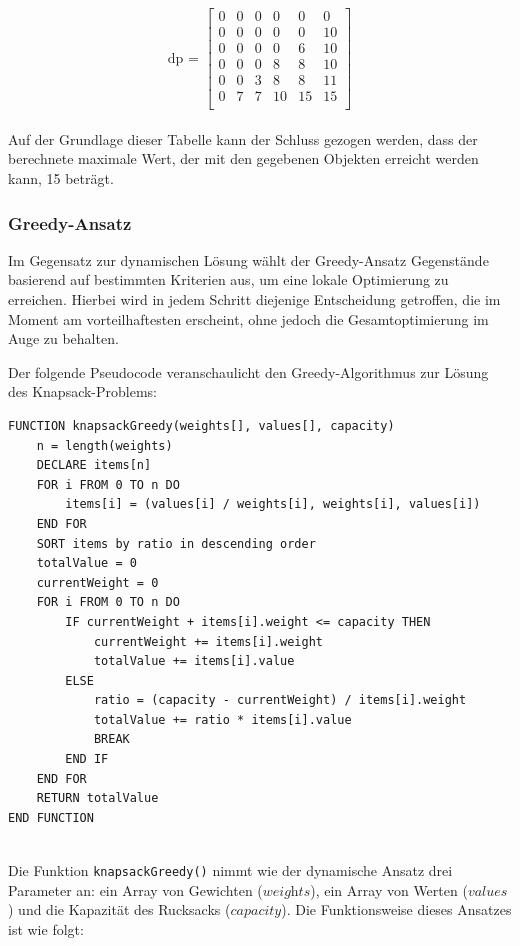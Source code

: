 \[
\text{dp = }
\left[
\begin{array}{cccccc}
0 & 0 & 0 & 0 & 0 & 0 \\
0 & 0 & 0 & 0 & 0 & 10 \\
0 & 0 & 0 & 0 & 6 & 10 \\
0 & 0 & 0 & 8 & 8 & 10 \\
0 & 0 & 3 & 8 & 8 & 11 \\
0 & 7 & 7 & 10 & 15 & 15 \\
\end{array}
\right]
\]
\\
Auf der Grundlage dieser Tabelle kann der Schluss gezogen werden, dass der berechnete maximale Wert, der mit den gegebenen Objekten erreicht werden kann, 15 beträgt.

\subsubsection{Greedy-Ansatz}
Im Gegensatz zur dynamischen Lösung wählt der Greedy-Ansatz Gegenstände basierend auf bestimmten Kriterien aus, um eine
lokale Optimierung zu erreichen. Hierbei wird in jedem Schritt diejenige Entscheidung getroffen, die im Moment am
vorteilhaftesten erscheint, ohne jedoch die Gesamtoptimierung im Auge zu behalten.

Der folgende Pseudocode veranschaulicht den Greedy-Algorithmus zur Lösung des Knapsack-Problems:

\begin{lstlisting}[style=csharp, caption={Greedy Algorithmus}]
FUNCTION knapsackGreedy(weights[], values[], capacity)
    n = length(weights)
    DECLARE items[n]
    FOR i FROM 0 TO n DO
        items[i] = (values[i] / weights[i], weights[i], values[i])
    END FOR
    SORT items by ratio in descending order
    totalValue = 0
    currentWeight = 0
    FOR i FROM 0 TO n DO
        IF currentWeight + items[i].weight <= capacity THEN
            currentWeight += items[i].weight
            totalValue += items[i].value
        ELSE
            ratio = (capacity - currentWeight) / items[i].weight
            totalValue += ratio * items[i].value
            BREAK
        END IF
    END FOR
    RETURN totalValue
END FUNCTION
\end{lstlisting}\\
Die Funktion \texttt{knapsackGreedy()} nimmt wie der dynamische Ansatz drei Parameter an: ein Array von Gewichten (\( \textit{weights} \)),
ein Array von Werten (\( \textit{values} \)) und die Kapazität des Rucksacks (\( \textit{capacity} \)). Die Funktionsweise
dieses Ansatzes ist wie folgt:

